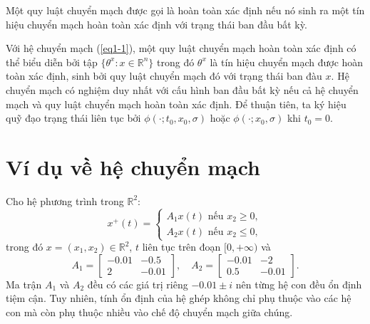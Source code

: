 \documentclass[14pt,a4paper,oneside]{report}		%
\begin{document}
Một quy luật chuyển mạch được gọi là hoàn toàn xác định nếu nó sinh ra một tín hiệu chuyển mạch hoàn toàn xác định với trạng thái ban đầu bất kỳ.

Với hệ chuyển mạch (\ref{eq1-1}), một quy luật chuyển mạch hoàn toàn xác định có thể biểu diễn bởi tập $\{\theta^x:x\in\mathbb{R}^n\}$ trong đó $\theta^x$ là tín hiệu chuyển mạch được hoàn toàn xác định, sinh bởi quy luật chuyển mạch đó với trạng thái ban đàu $x$. Hệ chuyển mạch có nghiệm duy nhất với cấu hình ban đầu bất kỳ nếu cả hệ chuyển mạch và quy luật chuyển mạch hoàn toàn xác định. Để thuận tiên, ta ký hiệu quỹ đạo trạng thái liên tục bởi $\phi(\cdot;t_0,x_0,\sigma)$ hoặc $\phi(\cdot;x_0,\sigma)$ khi $t_0=0$.

\section{Ví dụ về hệ chuyển mạch}
Cho hệ phương trình trong $\mathbb{R}^2$:
$$x^+(t) = 
\begin{cases} 
A_1x(t) \mbox{ nếu } x_2\geq 0, \\ 
A_2x(t) \mbox{ nếu } x_2\leq 0,
\end{cases}
$$
trong đó $x=(x_1,x_2)\in\mathbb{R}^2$, $t$ liên tục trên đoạn $[0,+\infty)$ và
$$
A_1 = \begin{bmatrix} -0.01 & -0.5 \\ 2 & -0.01 \end{bmatrix} ,\quad 
A_2 = \begin{bmatrix} -0.01 & -2 \\ 0.5 & -0.01 \end{bmatrix} .
$$
Ma trận $A_1$ và $A_2$ đều có các giá trị riêng $-0.01\pm i$ nên từng hệ con đều ổn định tiệm cận. Tuy nhiên, tính ổn định của hệ ghép không chỉ phụ thuộc vào các hệ con mà còn phụ thuộc nhiều vào chế độ chuyển mạch giữa chúng.
\end{document}
